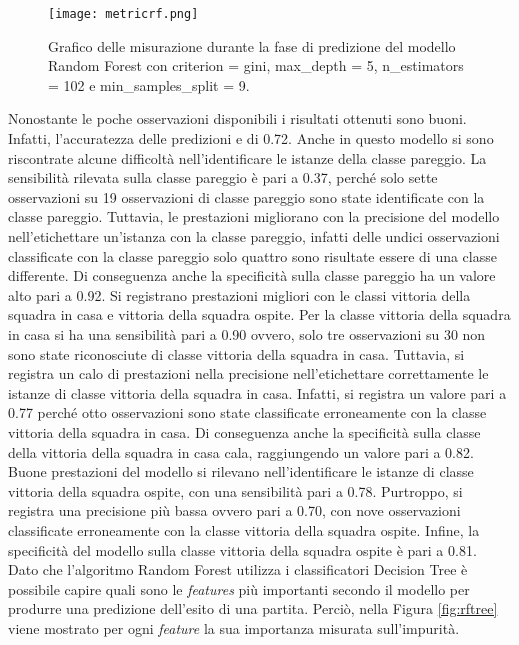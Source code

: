 \begin{figure}[]
	\begin{center}
		\texttt{[image: metricrf.png]}
		\caption{Grafico delle misurazione durante la fase di predizione del modello Random Forest con \textsf{criterion} = gini, \textsf{max\_depth} = 5, \textsf{n\_estimators} = 102 e \textsf{min\_samples\_split} = 9.
		} 
		\label{fig:rfmetrics}
	\end{center}
\end{figure}
Nonostante le poche osservazioni disponibili i risultati ottenuti sono buoni. Infatti, l'accuratezza delle predizioni e di 0.72. Anche in questo modello si sono riscontrate alcune difficoltà nell'identificare le istanze della classe pareggio. La sensibilità rilevata sulla classe pareggio è pari a 0.37, perché solo sette osservazioni su 19 osservazioni di classe pareggio sono state identificate con la classe pareggio. Tuttavia, le prestazioni migliorano con la precisione del modello nell'etichettare un'istanza con la classe pareggio, infatti delle undici osservazioni classificate con la classe pareggio solo quattro sono risultate essere di una classe differente. Di conseguenza anche la specificità sulla classe pareggio ha un valore alto pari a 0.92. Si registrano prestazioni migliori con le classi vittoria della squadra in casa e vittoria della squadra ospite. Per la classe vittoria della squadra in casa si ha una sensibilità pari a 0.90 ovvero, solo tre osservazioni su 30 non sono state riconosciute di classe vittoria della squadra in casa. Tuttavia, si registra un calo di prestazioni nella precisione nell'etichettare correttamente le istanze di classe vittoria della squadra in casa. Infatti, si registra un valore pari a 0.77 perché otto osservazioni sono state classificate erroneamente con la classe vittoria della squadra in casa. Di conseguenza anche la specificità sulla classe della vittoria della squadra in casa cala, raggiungendo un valore pari a 0.82. Buone prestazioni del modello si rilevano nell'identificare le istanze di classe vittoria della squadra ospite, con una sensibilità pari a 0.78. Purtroppo, si registra una precisione più bassa ovvero pari a 0.70, con nove osservazioni classificate erroneamente con la classe vittoria della squadra ospite. Infine, la specificità del modello sulla classe vittoria della squadra ospite è pari a 0.81.\\
Dato che l'algoritmo Random Forest utilizza i classificatori Decision Tree è possibile capire quali sono le \emph{features} più importanti secondo il modello per produrre una predizione dell'esito di una partita. Perciò, nella Figura \ref{fig:rftree} viene mostrato per ogni \emph{feature} la sua importanza misurata sull'impurità.
